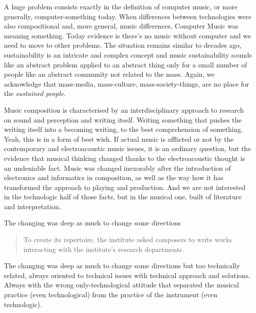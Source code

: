 \documentclass[twoside,a4paper]{article}
\begin{document}
A huge problem consists exactly in the definition of computer music, or more generally, computer-something today. When differences between technologies were also compositional and, more general, music differences, Computer Music was meaning something. Today evidence is there's no music without computer and we need to move to other problems. The situation remains similar to decades ago, sustainability is an intricate and complex concept and music sustainability sounds like an abstract problem applied to an abstract thing only for a small number of people like an abstract community not related to the mass. Again, we acknowledge that mass-media, mass-culture, mass-society-things, are no place for the \emph{sustained people}.

Music composition is characterised by an interdisciplinary approach to research on sound and perception and writing itself. Writing something that pushes the writing itself into a becoming writing, to the best comprehension of something. Yeah, this is in a form of best wish. If actual music is afflicted or not by the contemporary and electroacoustic music issues, it is an ordinary question, but the evidence that musical thinking changed thanks to the electroacoustic thought is an undeniable fact. Music was changed inexorably after the introduction of electronics and informatics in composition, as well as the way how it has transformed the approach to playing and production. And we are not interested in the technologic half of those facts, but in the musical one, built of literature and interpretation.

The changing was deep as much to change some directions

\begin{quote}
To create its repertoire, the institute asked composers to write works interacting with the institute’s research departments\cite{Lem16}.
\end{quote}

The changing was deep as much to change some directions but too technically related, always oriented to technical issues with technical approach and solutions. Always with the wrong only-technological attitude that separated the musical practice (even technological) from the practice of the instrument (even technologic). 

\end{document}
